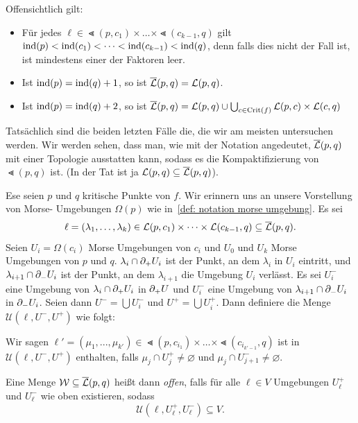 
Offensichtlich gilt:
\begin{itemize}
    \item Für jedes $\ell \in \Lt (p, c_1) \times \dots \times \Lt (c_{k - 1}, q)$ gilt 
        ${ \operatorname{ind} } (p) < { \operatorname{ind} } (c_1) < \dots < { \operatorname{ind} } (c_{k - 1}) < { \operatorname{ind} } (q)$, denn falls dies nicht
        der Fall ist, ist mindestens einer der Faktoren leer. 
    \item Ist ${ \operatorname{ind} } (p) = { \operatorname{ind} } (q) + 1$, so ist ${\overline{\mathcal{L}} } (p, q) = { \mathcal{L} } (p, q)$.
    \item Ist ${ \operatorname{ind} } (p) = { \operatorname{ind} } (q) + 2$, so ist 
        ${\overline{\mathcal{L}} } (p, q) = { \mathcal{L} } (p, q) \cup \bigcup_{c \in { \operatorname{Crit} } (f)} { \mathcal{L} }(p, c) \times { \mathcal{L} }(c, q)$
\end{itemize}
Tatsächlich sind die beiden letzten Fälle die, die wir am meisten untersuchen werden.
Wir werden sehen, dass man, wie mit der Notation angedeutet, ${\overline{\mathcal{L}} } (p, q)$ mit einer Topologie 
ausstatten kann, sodass es die Kompaktifizierung von $\Lt (p, q)$ ist. (In der Tat ist ja 
${ \mathcal{L} } (p, q) \subseteq {\overline{\mathcal{L}} } (p, q)$).

\begin{definition}
    \label{def: topologie gebrochener trajektorien}
    Ese seien $p$ und $q$ kritische Punkte von $f$. Wir erinnern uns an unsere Vorstellung von Morse-
    Umgebungen $\Omega(p)$ wie in~\ref{def: notation morse umgebung}.
    Es sei
    \[ \ell = (\lambda_1, \dots, \lambda_k) 
        \in { \mathcal{L} } (p, c_1) \times \dots \times { \mathcal{L} }(c_{k - 1}, q) \subseteq {\overline{\mathcal{L}} } (p, q) . \]
    Seien $U_i = \Omega(c_i)$ Morse Umgebungen von $c_i$ und $U_0$ und $U_k$ Morse 
    Umgebungen von $p$ und $q$. $\lambda_i \cap { \partial }_+ U_i$ ist der Punkt, an dem $\lambda_i$
    in $U_i$ eintritt, und $\lambda_{i + 1} \cap { \partial }_- U_i$ ist der Punkt, an dem 
    $\lambda_{i + 1}$ die Umgebung $U_i$ verlässt. Es sei $U_i^-$ eine Umgebung von 
    $\lambda_i \cap { \partial }_+ U_i$ in 
    ${ \partial }_+ U$ und $U_i^-$ eine Umgebung von $\lambda_{i + 1} \cap { \partial }_- U_i$ in ${ \partial }_- U_i$. 
    Seien dann $U^- = \bigcup U_i^-$ und $U^+ = \bigcup U_i^+$. Dann definiere die Menge 
    $\mathcal{U} (\ell, U^-, U^+)$ wie folgt:

    Wir sagen 
    $\ell' = (\mu_1, ..., \mu_{k'}) \in \Lt (p, c_{i_1}) \times \dots \times \Lt (c_{i_{k'-1}}, q)$
    ist in $\mathcal{U}(\ell, U^-, U^+)$ enthalten, falls $\mu_j \cap U_j^+ \neq \varnothing$
    und $\mu_j \cap U_{j + 1}^- \neq \varnothing$. 

    Eine Menge $\mathcal{W} \subseteq {\overline{\mathcal{L}} } (p, q)$ heißt dann \textit{offen}, falls für alle 
    $\ell \in V$ Umgebungen $U_{\ell}^+$ und $U_{\ell}^-$ wie oben existieren, sodass 
    \[ \mathcal{U}(\ell, U_{\ell}^+, U_{\ell}^-) \subseteq V . \]
\end{definition}

